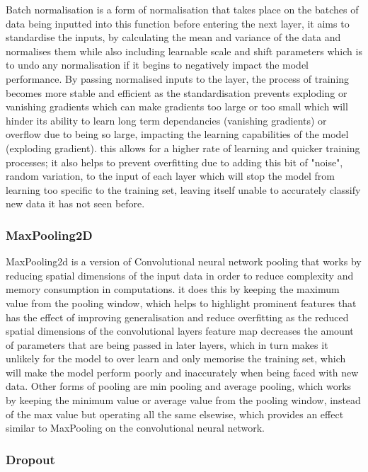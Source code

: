 \documentclass[]{final_report}
\begin{document}
Batch normalisation is a form of normalisation that takes place on the batches of data being inputted into this function before entering the next layer, it aims to standardise the inputs, by calculating the mean and variance of the data and normalises them while also including learnable scale and shift parameters which is to undo any normalisation if it begins to negatively impact the model performance. By passing normalised inputs to the layer, the process of training becomes more stable and efficient as the standardisation prevents exploding or vanishing gradients which can make gradients too large or too small which will hinder its ability to learn long term dependancies (vanishing gradients) or overflow due to being so large, impacting the learning capabilities of the model (exploding gradient). this allows for a higher rate of learning and quicker training processes; it also helps to prevent overfitting due to adding this bit of "noise", random variation, to the input of each layer which will stop the model from learning too specific to the training set, leaving itself unable to accurately classify new data it has not seen before.\cite{Normalization2025}

\subsubsection{MaxPooling2D}

MaxPooling2d is a version of Convolutional neural network pooling that works by reducing spatial dimensions of the input data in order to reduce complexity and memory consumption in computations. it does this by keeping the maximum value from the pooling window, which helps to highlight prominent features that has the effect of improving generalisation and reduce overfitting as the reduced spatial dimensions of the convolutional layers feature map decreases the amount of parameters that are being passed in later layers, which in turn makes it unlikely for the model to over learn and only memorise the training set, which will make the model perform poorly and inaccurately when being faced with new data. Other forms of pooling are min pooling and average pooling, which works by keeping the minimum value or average value from the pooling window, instead of the max value but operating all the same elsewise, which provides an effect similar to MaxPooling on the convolutional neural network.\cite{UpGrad2025}

\subsubsection{Dropout}
\end{document}
